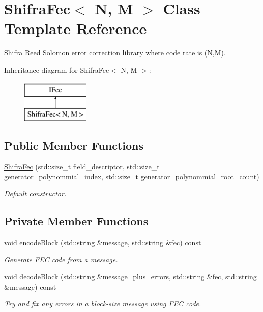 \hypertarget{classefb_1_1ShifraFec}{
\section{ShifraFec$<$ N, M $>$ Class Template Reference}
\label{classefb_1_1ShifraFec}
}


Shifra Reed Solomon error correction library where code rate is (N,M).  


Inheritance diagram for ShifraFec$<$ N, M $>$:\begin{figure}[H]
\begin{center}
\leavevmode
\includegraphics[height=2.000000cm]{classefb_1_1ShifraFec}
\end{center}
\end{figure}
\subsection*{Public Member Functions}
\begin{DoxyCompactItemize}
\item 
\hyperlink{classefb_1_1ShifraFec_a5423cbbbac1657aaa4869a56f57c7812}{ShifraFec} (std::size\_\-t field\_\-descriptor, std::size\_\-t generator\_\-polynommial\_\-index, std::size\_\-t generator\_\-polynommial\_\-root\_\-count)
\begin{DoxyCompactList}\small\item\em Default constructor. \item\end{DoxyCompactList}\end{DoxyCompactItemize}
\subsection*{Private Member Functions}
\begin{DoxyCompactItemize}
\item 
void \hyperlink{classefb_1_1ShifraFec_abfa614d594bf4d7c86b6a8817f35dec5}{encodeBlock} (std::string \&message, std::string \&fec) const 
\begin{DoxyCompactList}\small\item\em Generate FEC code from a message. \item\end{DoxyCompactList}\item 
void \hyperlink{classefb_1_1ShifraFec_a00958e2a880e71ba6a8b6a0e8f560c45}{decodeBlock} (std::string \&message\_\-plus\_\-errors, std::string \&fec, std::string \&message) const 
\begin{DoxyCompactList}\small\item\em Try and fix any errors in a block-\/size message using FEC code. \item\end{DoxyCompactList}\end{DoxyCompactItemize}
